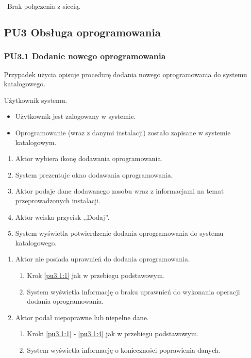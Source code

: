 \
Brak połączenia z siecią.

\subsection{PU3 Obsługa oprogramowania} \label{pu3}
\subsubsection{PU3.1 Dodanie nowego oprogramowania}

Przypadek użycia opisuje procedurę dodania nowego oprogramowania do systemu katalogowego.

Użytkownik systemu.

\begin{itemize}
\item Użytkownik jest zalogowany w systemie.
\end{itemize}

\begin{itemize}
\item Oprogramowanie (wraz z danymi instalacji) zostało zapisane w systemie katalogowym.
\end{itemize}

\begin{enumerate}
\item \label{pu3.1:1} Aktor wybiera ikonę dodawania oprogramowania.
\item System prezentuje okno dodawania oprogramowania.
\item Aktor podaje dane dodawanego zasobu wraz z informacjami na temat przeprowadzonych instalacji.
\item \label{pu3.1:4} Aktor wciska przycisk ,,Dodaj''.
\item System wyświetla potwierdzenie dodania oprogramowania do systemu katalogowego.
\end{enumerate}

\begin{enumerate}
\item Aktor nie posiada uprawnień do dodania oprogramowania.
	\begin{enumerate}[label*=\arabic*.]
		\item Krok \ref{pu3.1:1} jak w przebiegu podstawowym.
		\item System wyświetla informację o braku uprawnień do wykonania operacji dodania oprogramowania.
	\end{enumerate}
\item Aktor podał niepoprawne lub niepełne dane.
	\begin{enumerate}[label*=\arabic*.]
		\item Kroki \ref{pu3.1:1} - \ref{pu3.1:4} jak w przebiegu podstawowym.
		\item System wyświetla informację o konieczności poprawienia danych.
	\end{enumerate}
\end{enumerate}

